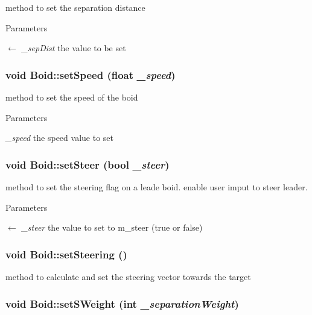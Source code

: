 method to set the separation distance 
\begin{DoxyParams}{Parameters}
\item[\mbox{$\leftarrow$} {\em \_\-sepDist}]the value to be set \end{DoxyParams}
\hypertarget{classBoid_a6a8b730efcf6b98cbf56aaa905bc7508}{
\subsubsection[{setSpeed}]{\setlength{\rightskip}{0pt plus 5cm}void Boid::setSpeed (float {\em \_\-speed})}}
\label{classBoid_a6a8b730efcf6b98cbf56aaa905bc7508}


method to set the speed of the boid 
\begin{DoxyParams}{Parameters}
\item[{\em \_\-speed}]the speed value to set \end{DoxyParams}
\hypertarget{classBoid_a8196c708a9fc60aeb29bfc4134253cd2}{
\subsubsection[{setSteer}]{\setlength{\rightskip}{0pt plus 5cm}void Boid::setSteer (bool {\em \_\-steer})}}
\label{classBoid_a8196c708a9fc60aeb29bfc4134253cd2}


method to set the steering flag on a leade boid. enable user imput to steer leader. 
\begin{DoxyParams}{Parameters}
\item[\mbox{$\leftarrow$} {\em \_\-steer}]the value to set to m\_\-steer (true or false) \end{DoxyParams}
\hypertarget{classBoid_aa2b619d85612051c88b2e7cc67ac0115}{
\subsubsection[{setSteering}]{\setlength{\rightskip}{0pt plus 5cm}void Boid::setSteering ()}}
\label{classBoid_aa2b619d85612051c88b2e7cc67ac0115}


method to calculate and set the steering vector towards the target \hypertarget{classBoid_af24205fb4e30e0e746c3146c59252fda}{
\subsubsection[{setSWeight}]{\setlength{\rightskip}{0pt plus 5cm}void Boid::setSWeight (int {\em \_\-separationWeight})}}
\label{classBoid_af24205fb4e30e0e746c3146c59252fda}


